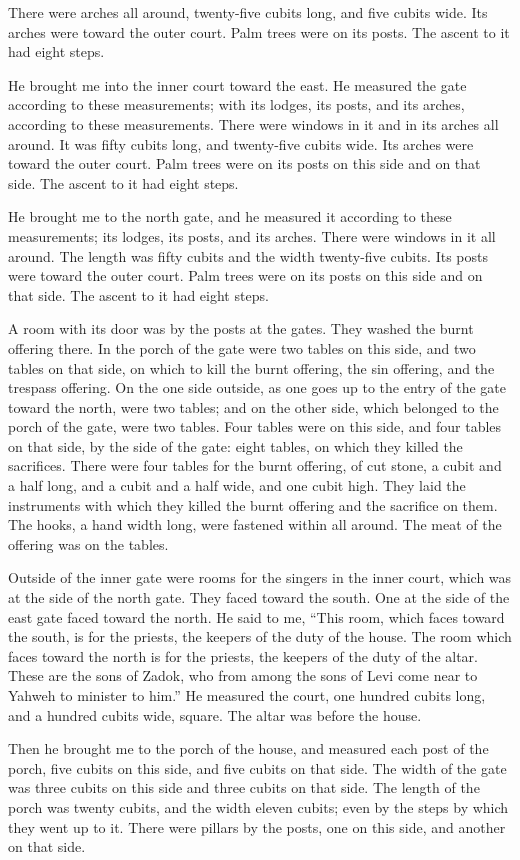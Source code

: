 {There were arches all around, twenty-five cubits long, and five cubits wide.
Its arches were toward the outer court. Palm trees were on its posts. The ascent to it had eight steps.
\par }{\PP {}He brought me into the inner court toward the east. He measured the gate according to these measurements;
with its lodges, its posts, and its arches, according to these measurements. There were windows in it and in its arches all around. It was fifty cubits long, and twenty-five cubits wide.
Its arches were toward the outer court. Palm trees were on its posts on this side and on that side. The ascent to it had eight steps.
\par }{\PP {}He brought me to the north gate, and he measured it according to these measurements;
its lodges, its posts, and its arches. There were windows in it all around. The length was fifty cubits and the width twenty-five cubits.
Its posts were toward the outer court. Palm trees were on its posts on this side and on that side. The ascent to it had eight steps.
\par }{\PP {}A room with its door was by the posts at the gates. They washed the burnt offering there.
In the porch of the gate were two tables on this side, and two tables on that side, on which to kill the burnt offering, the sin offering, and the trespass offering.
On the one side outside, as one goes up to the entry of the gate toward the north, were two tables; and on the other side, which belonged to the porch of the gate, were two tables.
Four tables were on this side, and four tables on that side, by the side of the gate: eight tables, on which they killed the sacrifices.
There were four tables for the burnt offering, of cut stone, a cubit and a half long, and a cubit and a half wide, and one cubit high. They laid the instruments with which they killed the burnt offering and the sacrifice on them.
The hooks, a hand width long, were fastened within all around. The meat of the offering was on the tables.
\par }{\PP {}Outside of the inner gate were rooms for the singers in the inner court, which was at the side of the north gate. They faced toward the south. One at the side of the east gate faced toward the north.
He said to me, “This room, which faces toward the south, is for the priests, the keepers of the duty of the house.
The room which faces toward the north is for the priests, the keepers of the duty of the altar. These are the sons of Zadok, who from among the sons of Levi come near to Yahweh to minister to him.”
He measured the court, one hundred cubits long, and a hundred cubits wide, square. The altar was before the house.
\par }{\PP {}Then he brought me to the porch of the house, and measured each post of the porch, five cubits on this side, and five cubits on that side. The width of the gate was three cubits on this side and three cubits on that side.
The length of the porch was twenty cubits, and the width eleven cubits; even by the steps by which they went up to it. There were pillars by the posts, one on this side, and another on that side.

}
